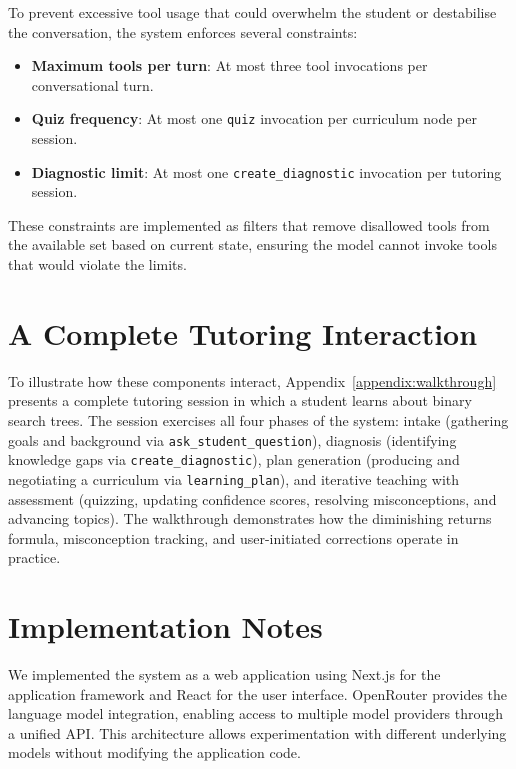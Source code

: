 \documentclass[logo,bsc,singlespacing,parskip,online]{infthesis}
\begin{document}
To prevent excessive tool usage that could overwhelm the student or destabilise the conversation, the system enforces several constraints:

\begin{itemize}
\item \textbf{Maximum tools per turn}: At most three tool invocations per conversational turn.
\item \textbf{Quiz frequency}: At most one \texttt{quiz} invocation per curriculum node per session.
\item \textbf{Diagnostic limit}: At most one \texttt{create\_diagnostic} invocation per tutoring session.
\end{itemize}

These constraints are implemented as filters that remove disallowed tools from the available set based on current state, ensuring the model cannot invoke tools that would violate the limits.

\section{A Complete Tutoring Interaction}

To illustrate how these components interact, Appendix~\ref{appendix:walkthrough} presents a complete tutoring session in which a student learns about binary search trees. The session exercises all four phases of the system: intake (gathering goals and background via \texttt{ask\_student\_question}), diagnosis (identifying knowledge gaps via \texttt{create\_diagnostic}), plan generation (producing and negotiating a curriculum via \texttt{learning\_plan}), and iterative teaching with assessment (quizzing, updating confidence scores, resolving misconceptions, and advancing topics). The walkthrough demonstrates how the diminishing returns formula, misconception tracking, and user-initiated corrections operate in practice.

\section{Implementation Notes}

We implemented the system as a web application using Next.js for the application framework and React for the user interface. OpenRouter provides the language model integration, enabling access to multiple model providers through a unified API. This architecture allows experimentation with different underlying models without modifying the application code.
\end{document}
